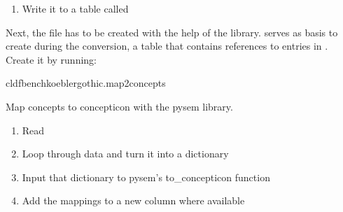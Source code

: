 \documentclass[letterpaper,10pt,english]{sphinxmanual}
\begin{document}
{{{{\begin{fulllineitems}
\begin{enumerate}
\item {} 
\sphinxAtStartPar
Write it to a table called 

\end{enumerate}

\end{fulllineitems}


\sphinxAtStartPar
Next, the file  has to be created with the help of the
 library. 
serves as basis to create  during the conversion,
a table that contains references to entries in . Create it by running:

\begin{sphinxVerbatim}[commandchars=\\\{\}]
cldfbenchkoeblergothic.map2concepts
\end{sphinxVerbatim}
\label{\detokenize{mkcldf:module-koeblergothiccommands.map2concepts}}
\sphinxAtStartPar
Map concepts to concepticon with the pysem library.

\begin{fulllineitems}
\label{\detokenize{mkcldf:koeblergothiccommands.map2concepts.run}}
\pysigstartsignatures
{}
\pysigstopsignatures\begin{enumerate}
%
\item {} 
\sphinxAtStartPar
Read 

\item {} 
\sphinxAtStartPar
Loop through data and turn it into a dictionary

\item {} 
\sphinxAtStartPar
Input that dictionary to pysem’s to\_concepticon function

\item {} 
\sphinxAtStartPar
Add the mappings to a new column where available


\end{enumerate}
\end{fulllineitems}}}}}
\end{document}
